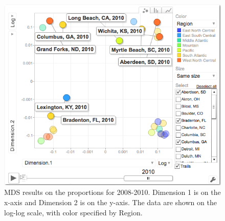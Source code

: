 \documentclass[11pt]{asaproc}
\begin{document}
\begin{figure}[H]
\begin{framed}
\hspace{0.5cm}
\begin{minipage}[b]{0.45\linewidth}
\centering
\includegraphics[width=\textwidth]{mdsproportions10.png}
\end{minipage}
\hspace{0.5cm}
\begin{minipage}[b]{0.45\linewidth}
\centering
\caption{MDS results on the proportions for
  2008-2010. Dimension 1 is on the x-axis and Dimension 2 is on the
  y-axis. The data are shown on the log-log scale, with color
  specified by Region.}
\label{fig:mdsMCproportions}
\end{minipage}
\end{framed}
\end{figure}
\end{document}
